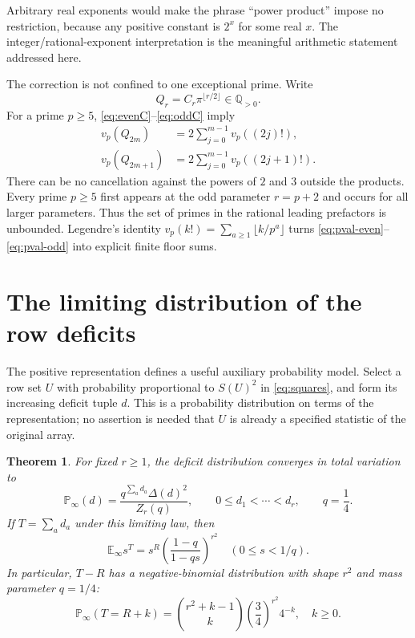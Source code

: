 \documentclass[11pt]{article}
\numberwithin{equation}{section}
\newtheorem{theorem}{Theorem}[section]
\theoremstyle{definition}
\newcommand{\EE}{\mathbb{E}}
\newcommand{\PP}{\mathbb{P}}
\newcommand{\vander}{\Delta}
\begin{document}
Arbitrary real exponents would make the phrase ``power product'' impose no restriction, because any positive constant is $2^x$ for some real $x$. The integer/rational-exponent interpretation is the meaningful arithmetic statement addressed here.

The correction is not confined to one exceptional prime. Write
\[
 Q_r=C_r\pi^{\lfloor r/2\rfloor}\in\mathbb Q_{>0}.
\]
For a prime $p\geq5$, \eqref{eq:evenC}--\eqref{eq:oddC} imply
\begin{align}
 v_p(Q_{2m})&=2\sum_{j=0}^{m-1}v_p((2j)!),\label{eq:pval-even}\\
 v_p(Q_{2m+1})&=2\sum_{j=0}^{m-1}v_p((2j+1)!).\label{eq:pval-odd}
\end{align}
There can be no cancellation against the powers of $2$ and $3$ outside the products. Every prime $p\geq5$ first appears at the odd parameter $r=p+2$ and occurs for all larger parameters. Thus the set of primes in the rational leading prefactors is unbounded. Legendre's identity $v_p(k!)=\sum_{a\geq1}\lfloor k/p^a\rfloor$ turns \eqref{eq:pval-even}--\eqref{eq:pval-odd} into explicit finite floor sums.

\section{The limiting distribution of the row deficits}\label{sec:deficit-law}

The positive representation defines a useful auxiliary probability model. Select a row set $U$ with probability proportional to $S(U)^2$ in \eqref{eq:squares}, and form its increasing deficit tuple $d$. This is a probability distribution on terms of the representation; no assertion is needed that $U$ is already a specified statistic of the original array.

\begin{theorem}\label{thm:deficits}
For fixed $r\geq1$, the deficit distribution converges in total variation to
\begin{equation}\label{eq:deficit-law}
 \PP_\infty(d)=\frac{q^{\sum_a d_a}\vander(d)^2}{Z_r(q)},
 \qquad 0\leq d_1<\cdots<d_r,\qquad q=\frac14.
\end{equation}
If $T=\sum_a d_a$ under this limiting law, then
\begin{equation}\label{eq:deficitpgf}
 \EE_\infty s^T=s^R\left(\frac{1-q}{1-qs}\right)^{r^2}
 \quad(0\leq s<1/q).
\end{equation}
In particular, $T-R$ has a negative-binomial distribution with shape $r^2$ and mass parameter $q=1/4$:
\begin{equation}\label{eq:negativebinomial}
 \PP_\infty(T=R+k)=\binom{r^2+k-1}{k}
                     \left(\frac34\right)^{r^2}4^{-k},\quad k\geq0.
\end{equation}
\end{theorem}
\end{document}

